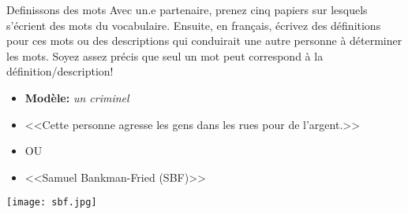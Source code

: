 \begin{frame}{Definissons des mots}
  Avec un.e partenaire, prenez cinq papiers sur lesquels s'écrient des mots du vocabulaire.
  Ensuite, \alert{en français}, écrivez des définitions pour ces mots ou des descriptions qui conduirait une autre personne à déterminer les mots.
  Soyez assez précis que seul un mot peut correspond à la définition/description!
  \begin{itemize}
    \item[] \textbf{Modèle:} \emph{un criminel}
    \item {}<<Cette personne agresse les gens dans les rues pour de l'argent.>>
    \item[] OU
    \item {}<<Samuel Bankman-Fried (SBF)>>
  \end{itemize}
  \begin{flushright}
    \texttt{[image: sbf.jpg]}
  \end{flushright}
\end{frame}